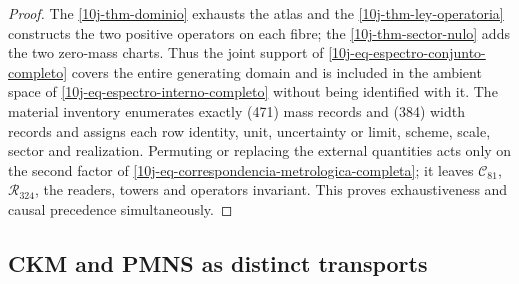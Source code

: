 \begin{proof}
The \cref{10j-thm-dominio} exhausts the atlas and the \cref{10j-thm-ley-operatoria} constructs the two positive operators on each fibre; the \cref{10j-thm-sector-nulo} adds the two zero-mass charts. Thus the joint support of \eqref{10j-eq-espectro-conjunto-completo} covers the entire generating domain and is included in the ambient space of \eqref{10j-eq-espectro-interno-completo} without being identified with it. The material inventory enumerates exactly (471) mass records and (384) width records and assigns each row identity, unit, uncertainty or limit, scheme, scale, sector and realization. Permuting or replacing the external quantities acts only on the second factor of \eqref{10j-eq-correspondencia-metrologica-completa}; it leaves \(\mathcal C_{81}\), \(\mathcal R_{324}\), the readers, towers and operators invariant. This proves exhaustiveness and causal precedence simultaneously.
\end{proof}

\subsection{CKM and PMNS as distinct transports}

